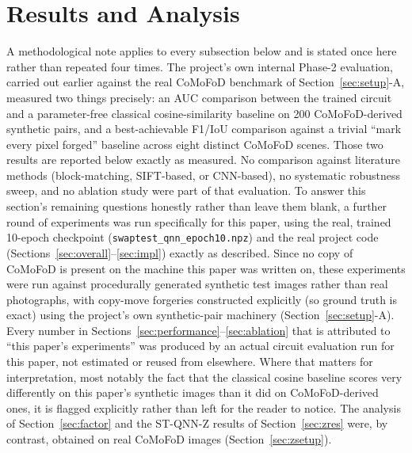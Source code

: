 \documentclass[conference]{IEEEtran}
\begin{document}
\section{Results and Analysis}\label{sec:results}
A methodological note applies to every subsection below and is stated once here rather than repeated four times. The project's own internal Phase-2 evaluation, carried out earlier against the real CoMoFoD benchmark of Section~\ref{sec:setup}-A, measured two things precisely: an AUC comparison between the trained circuit and a parameter-free classical cosine-similarity baseline on 200 CoMoFoD-derived synthetic pairs, and a best-achievable F1/IoU comparison against a trivial ``mark every pixel forged'' baseline across eight distinct CoMoFoD scenes. Those two results are reported below exactly as measured. No comparison against literature methods (block-matching, SIFT-based, or CNN-based), no systematic robustness sweep, and no ablation study were part of that evaluation. To answer this section's remaining questions honestly rather than leave them blank, a further round of experiments was run specifically for this paper, using the real, trained 10-epoch checkpoint (\texttt{swaptest\_qnn\_epoch10.npz}) and the real project code (Sections~\ref{sec:overall}--\ref{sec:impl}) exactly as described. Since no copy of CoMoFoD is present on the machine this paper was written on, these experiments were run against procedurally generated synthetic test images rather than real photographs, with copy-move forgeries constructed explicitly (so ground truth is exact) using the project's own synthetic-pair machinery (Section~\ref{sec:setup}-A). Every number in Sections~\ref{sec:performance}--\ref{sec:ablation} that is attributed to ``this paper's experiments'' was produced by an actual circuit evaluation run for this paper, not estimated or reused from elsewhere. Where that matters for interpretation, most notably the fact that the classical cosine baseline scores very differently on this paper's synthetic images than it did on CoMoFoD-derived ones, it is flagged explicitly rather than left for the reader to notice. The analysis of Section~\ref{sec:factor} and the ST-QNN-Z results of Section~\ref{sec:zres} were, by contrast, obtained on real CoMoFoD images (Section~\ref{sec:zsetup}).
\end{document}
